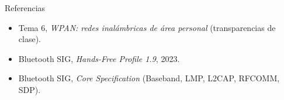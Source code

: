 \documentclass[aspectratio=169,10pt]{beamer}
\begin{document}
\begin{frame}{Referencias}
  \footnotesize
  \begin{itemize}
    \item Tema 6, \emph{WPAN: redes inalámbricas de área personal} (transparencias de clase).
    \item Bluetooth SIG, \emph{Hands-Free Profile 1.9}, 2023.
    \item Bluetooth SIG, \emph{Core Specification} (Baseband, LMP, L2CAP, RFCOMM, SDP).
  \end{itemize}
\end{frame}
\end{document}
